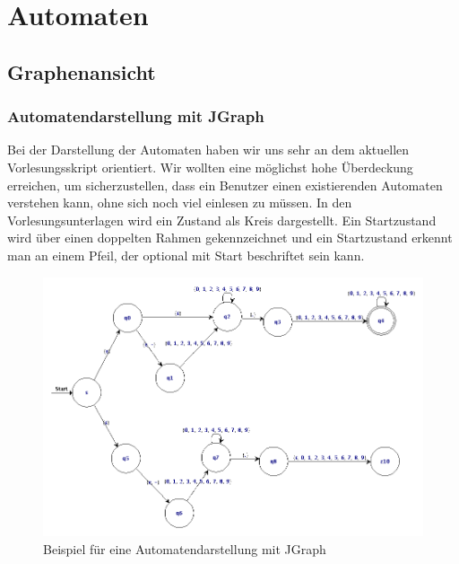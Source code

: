 

\chapter{Automaten}\label{Machines}


\section{Graphenansicht}


\subsection{Automatendarstellung mit JGraph}

Bei der Darstellung der Automaten haben wir uns sehr an dem aktuellen
Vorlesungsskript orientiert. Wir wollten eine möglichst hohe Überdeckung
erreichen, um sicherzustellen, dass ein Benutzer einen existierenden Automaten
verstehen kann, ohne sich noch viel einlesen zu müssen. In den
Vorlesungsunterlagen wird ein Zustand als Kreis
dargestellt. Ein Startzustand wird über einen doppelten Rahmen gekennzeichnet
und ein Startzustand erkennt man an einem Pfeil, der optional mit Start
beschriftet sein kann.\vspace{10pt}

\begin{figure}[h!]
\begin{center}
\includegraphics[width=12cm]{../images/enfa_example.png}
\caption{Beispiel für eine Automatendarstellung mit JGraph}
\end{center}
\end{figure}

